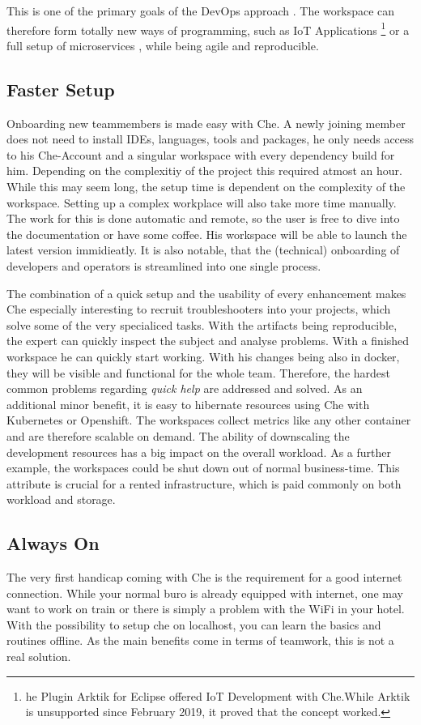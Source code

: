 \documentclass[utf8]{lni}
\begin{document}
This is one of the primary goals of the DevOps approach \cite{JA16}. 
The workspace can therefore form totally new ways of programming, such as IoT Applications \footnote{he Plugin Arktik for Eclipse offered IoT Development with Che.While Arktik is unsupported since February 2019, it proved that the concept worked.} or a full setup of microservices \cite{IV18}, while being agile and reproducible.

\subsection{Faster Setup}
Onboarding new teammembers is made easy with Che. 
A newly joining member does not need to install IDEs, languages, tools and packages, he only needs access to his Che-Account and a singular workspace with every dependency build for him.
Depending on the complexitiy of the project this required atmost an hour. 
While this may seem long, the setup time is dependent on the complexity of the workspace. 
Setting up a complex workplace will also take more time manually. 
The work for this is done automatic and remote, so the user is free to dive into the documentation or have some coffee. 
His workspace will be able to launch the latest version immidieatly.
It is also notable, that the (technical) onboarding of developers and operators is streamlined into one single process. 

The combination of a quick setup and the usability of every enhancement makes Che especially interesting to recruit troubleshooters into your projects, which solve some of the very specialiced tasks.  
With  the  artifacts  being  reproducible,  the  expert  can quickly inspect the subject and analyse problems.
With a finished workspace he can quickly start working. 
With his changes being also in docker, they will be visible and functional for the whole team.
Therefore,  the  hardest  common  problems  regarding \textit{quick help} are addressed and solved. 
As an additional minor benefit, it is easy to hibernate resources  using  Che  with  Kubernetes  or  Openshift.
The workspaces collect metrics like any other container and are therefore scalable on demand. 
The ability of downscaling the development resources has a big impact on the overall 
workload. 
As a further example, the workspaces could be shut down out of normal business-time. This attribute is crucial for a rented infrastructure, which is paid commonly on both workload and storage. 
\subsection{Always On}
The very first handicap coming with Che is the requirement for a good internet connection. 
While your normal buro is already equipped with internet, one may want to work on train or there is simply a problem with the WiFi in your hotel.
With the possibility to setup che on localhost, you can learn the basics and routines offline. As the main benefits come in terms of teamwork, this is not a real solution.
\end{document}
